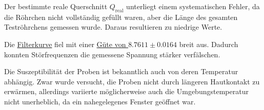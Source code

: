 Der bestimmte reale Querschnitt $Q_\text{real}$ unterliegt einem systematischen Fehler,
da die Röhrchen nicht vollständig gefüllt waren,
aber die Länge des gesamten Teströhrchens gemessen wurde.
Daraus resultieren zu niedrige Werte.


Die \hyperref[fig:plot_filterkurve]{Filterkurve} fiel mit einer \hyperref[misc:güte]{Güte von $8.7611 \pm 0.0164$} breit aus.
Dadurch konnten Störfrequenzen die gemessene Spannung stärker verfälschen.


Die Suszeptibilität der Proben ist bekanntlich auch von deren Temperatur abhängig.
Zwar wurde versucht, die Proben nicht durch längeren Hautkontakt zu erwärmen,
allerdings variierte möglicherweise auch die Umgebungstemperatur nicht unerheblich,
da ein nahegelegenes Fenster geöffnet war.


